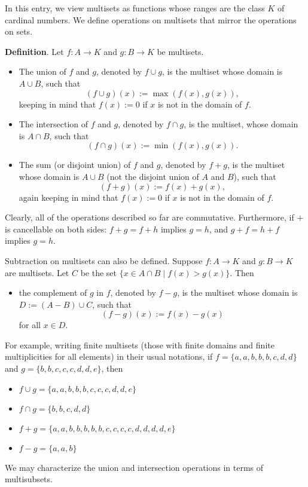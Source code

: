 \documentclass[12pt]{article}
\begin{document}
In this entry, we view multisets as functions whose ranges are the class $K$ of cardinal numbers.  We define operations on multisets that mirror the operations on sets.

\textbf{Definition}.  Let $f:A\to K$ and $g:B\to K$ be multisets.
\begin{itemize}
\item The union of $f$ and $g$, denoted by $f\cup g$, is the multiset whose domain is $A\cup B$, such that $$(f\cup g)(x):= \max(f(x),g(x)),$$ keeping in mind that $f(x):=0$ if $x$ is not in the domain of $f$.
\item The intersection of $f$ and $g$, denoted by $f\cap g$, is the multiset, whose domain is $A\cap B$, such that $$(f\cap g)(x):= \min(f(x),g(x)).$$
\item The sum (or disjoint union) of $f$ and $g$, denoted by $f+g$, is the multiset whose domain is $A\cup B$ (not the disjoint union of $A$ and $B$), such that $$(f+g)(x):=f(x)+g(x),$$ again keeping in mind that $f(x):=0$ if $x$ is not in the domain of $f$.
\end{itemize}
Clearly, all of the operations described so far are commutative.  Furthermore, if $+$ is cancellable on both sides: $f+g=f+h$ implies $g=h$, and $g+f=h+f$ implies $g=h$.  

Subtraction on multisets can also be defined.  Suppose $f:A\to K$ and $g:B\to K$ are multisets.  Let $C$ be the set $\lbrace x \in A\cap B \mid f(x)>g(x)\rbrace$.  Then 
\begin{itemize}
\item
the complement of $g$ in $f$, denoted by $f-g$, is the multiset whose domain is $D:=(A-B)\cup C$, such that $$(f-g)(x):=f(x)-g(x)$$ for all $x\in D$.
\end{itemize}

For example, writing finite multisets (those with finite domains and finite multiplicities for all elements) in their usual notations, if $f=\lbrace a,a, b,b,b, c,d,d\rbrace$ and $g=\lbrace b,b, c,c,c, d,d,e\rbrace$, then 
\begin{itemize}
\item $f\cup g=\lbrace a,a, b,b,b, c,c,c,d,d,e\rbrace$
\item $f\cap g=\lbrace b,b,c,d,d\rbrace$
\item $f+g=\lbrace a,a,b,b,b,b,b,c,c,c,c,d,d,d,d,e\rbrace$
\item $f-g=\lbrace a,a,b\rbrace$
\end{itemize}

We may characterize the union and intersection operations in terms of multisubsets.
\end{document}

